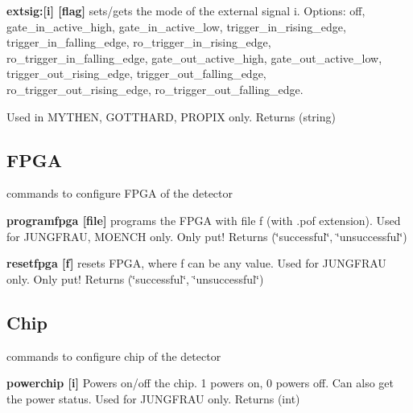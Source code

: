 \begin{DoxyItemize}
\item {\bfseries extsig:\mbox{[}i\mbox{]} \mbox{[}flag\mbox{]}} sets/gets the mode of the external signal i. Options: {\ttfamily off}, {\ttfamily gate\_\-in\_\-active\_\-high}, {\ttfamily gate\_\-in\_\-active\_\-low}, {\ttfamily trigger\_\-in\_\-rising\_\-edge}, {\ttfamily trigger\_\-in\_\-falling\_\-edge}, {\ttfamily ro\_\-trigger\_\-in\_\-rising\_\-edge}, {\ttfamily ro\_\-trigger\_\-in\_\-falling\_\-edge}, {\ttfamily gate\_\-out\_\-active\_\-high}, {\ttfamily gate\_\-out\_\-active\_\-low}, {\ttfamily trigger\_\-out\_\-rising\_\-edge}, {\ttfamily trigger\_\-out\_\-falling\_\-edge}, {\ttfamily ro\_\-trigger\_\-out\_\-rising\_\-edge}, {\ttfamily ro\_\-trigger\_\-out\_\-falling\_\-edge}. \par
 Used in MYTHEN, GOTTHARD, PROPIX only. {\ttfamily Returns} {\ttfamily }(string)
\end{DoxyItemize}\hypertarget{config_configfpga}{}\subsection{FPGA}\label{config_configfpga}
commands to configure FPGA of the detector


\begin{DoxyItemize}
\item {\bfseries programfpga \mbox{[}file\mbox{]}} programs the FPGA with file f (with .pof extension). Used for JUNGFRAU, MOENCH only. Only put! {\ttfamily Returns} {\ttfamily }(\char`\"{}successful\char`\"{}, \char`\"{}unsuccessful\char`\"{})
\end{DoxyItemize}


\begin{DoxyItemize}
\item {\bfseries resetfpga \mbox{[}f\mbox{]}} resets FPGA, where f can be any value. Used for JUNGFRAU only. Only put! {\ttfamily Returns} {\ttfamily }(\char`\"{}successful\char`\"{}, \char`\"{}unsuccessful\char`\"{})
\end{DoxyItemize}\hypertarget{config_configchip}{}\subsection{Chip}\label{config_configchip}
commands to configure chip of the detector


\begin{DoxyItemize}
\item {\bfseries powerchip \mbox{[}i\mbox{]}} Powers on/off the chip. 1 powers on, 0 powers off. Can also get the power status. Used for JUNGFRAU only. {\ttfamily Returns} {\ttfamily }(int)
\end{DoxyItemize}



